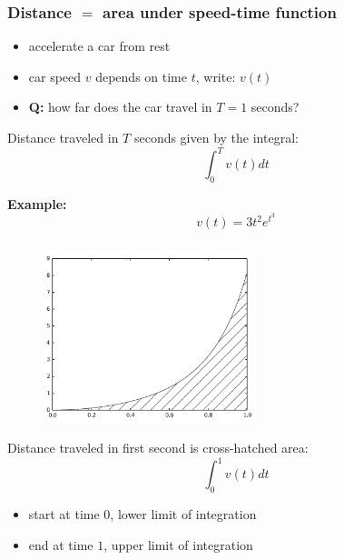 \documentclass[english,14pt]{beamer}
\begin{document}

\begin{frame}[fragile]

\frametitle{Distance $=$ area under speed-time function}

\begin{itemize}
	\item accelerate a car from rest
	\item car speed $v$ depends on time $t$, write: $v(t)$
	\item[] \textbf{Q:} how far does the car travel in $T=1$ seconds?
\end{itemize}

Distance traveled in $T$ seconds given by the integral:
\[
\int_0^T v(t)dt
\]

\textbf{Example:}
\[
v(t) = 3t^2e^{t^3}
\]

\end{frame}


\begin{frame}[fragile]

\frametitle{}

\vspace*{-1mm}
\begin{figure}[ht]
	\centering
	\includegraphics[width=0.55\textwidth]{figures/LLp134}
\end{figure}
\vspace*{-4mm}
Distance traveled in first second is cross-hatched area:
\[
\int_0^1 v(t)dt
\]

\begin{itemize}
	\item start at time $0$, lower limit of integration
	\item end at time $1$, upper limit of integration
\end{itemize}
	
\end{frame}
\end{document}

